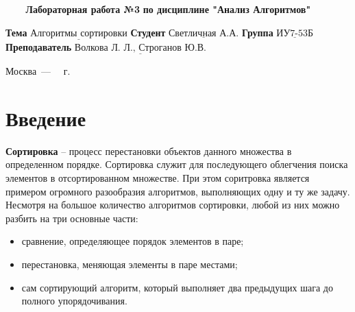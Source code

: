 \documentclass[a4paper,14pt, unknownkeysallowed]{extreport}
\begin{document}
\begin{titlepage}
	
	\begin{center}
		\noindent\begin{minipage}{1.3\textwidth}\centering
		\Large\textbf{   ~~~ Лабораторная работа №3}\newline
		\textbf{по дисциплине "Анализ Алгоритмов"}\newline\newline\newline
		\end{minipage}
	\end{center}
	
	\noindent\textbf{Тема} 			$\underline{\text{Алгоритмы сортировки}}$\newline\newline
	\noindent\textbf{Студент} 		$\underline{\text{Светличная А.А.}}$\newline\newline
	\noindent\textbf{Группа} 		$\underline{\text{ИУ7-53Б}}$\newline\newline
	\noindent\textbf{Преподаватель} $\underline{\text{Волкова Л. Л., Строганов Ю.В.}}$\newline
	
	\begin{center}
		\vfill
		Москва~---~\the\year
		~г.
	\end{center}
	\restoregeometry
\end{titlepage}
	
	\setcounter{page}{2}
	\tableofcontents
	
\newpage
\chapter*{Введение}
	
	
\textbf{Сортировка} -- процесс перестановки объектов данного множества в определенном порядке. 
Сортировка служит для последующего облегчения поиска элементов в отсортированном множестве. При этом соритровка является примером огромного разообразия алгоритмов, выполняющих одну и ту же задачу. 
Несмотря на большое количество алгоритмов сортировки, любой из них можно разбить на три основные части:

\begin{itemize}
    \item сравнение, определяющее порядок элементов в паре;
    \item перестановка, меняющая элементы в паре местами;
    \item сам сортирующий алгоритм, который выполняет два предыдущих шага до полного упорядочивания.
\end{itemize}
\end{document}
